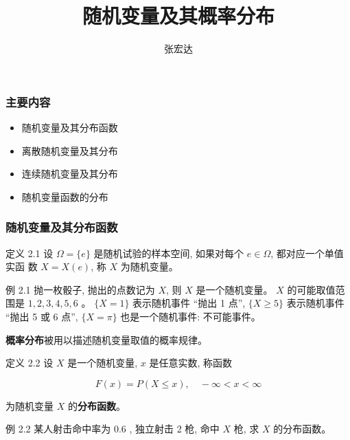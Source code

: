 \documentclass{beamer}
\title[]{随机变量及其概率分布}
\author[概率统计]{张宏达}
\institute{Nanjing University}
\date{}
\begin{document}
	\begin{frame}
		\titlepage
	\end{frame}
	
	\begin{frame}
		\frametitle{主要内容}
		\begin{itemize}
			\item 随机变量及其分布函数
			\item 离散随机变量及其分布
			\item 连续随机变量及其分布
			\item 随机变量函数的分布
		\end{itemize}
	\end{frame}
	
	\begin{frame}
		\frametitle{随机变量及其分布函数}
		定义 2.1 设 $\Omega=\{e\}$ 是随机试验的样本空间, 如果对每个 $e \in \Omega$, 都对应一个单值实函 数 $X=X(e)$, 称 $X$ 为随机变量。
		
		\vspace*{1cm}
		
		\vspace*{1cm}
		例 2.1 抛一枚骰子, 抛出的点数记为 $X$, 则 $X$ 是一个随机变量。 $X$ 的可能取值范 围是 $1,2,3,4,5,6$ 。 $\{X=1\}$ 表示随机事件 “抛出 1 点”, $\{X \geqslant 5\}$ 表示随机事件 “抛出 5 或 6 点”, $\{X=\pi\}$ 也是一个随机事件: 不可能事件。
		
		\vspace*{1cm}
		\textbf{概率分布}被用以描述随机变量取值的概率规律。
	\end{frame}
	
	\begin{frame}
		定义 2.2 设 $X$ 是一个随机变量, $x$ 是任意实数, 称函数
		
		$$
		F(x)=P(X \leqslant x), \quad-\infty<x<\infty
		$$
		
		为随机变量 $X$ 的\textbf{分布函数}。
		
		\vspace*{1cm}
		例 2.2 某人射击命中率为 0.6 , 独立射击 2 枪, 命中 $X$ 枪, 求 $X$ 的分布函数。
	\end{frame}
	
\end{document}
